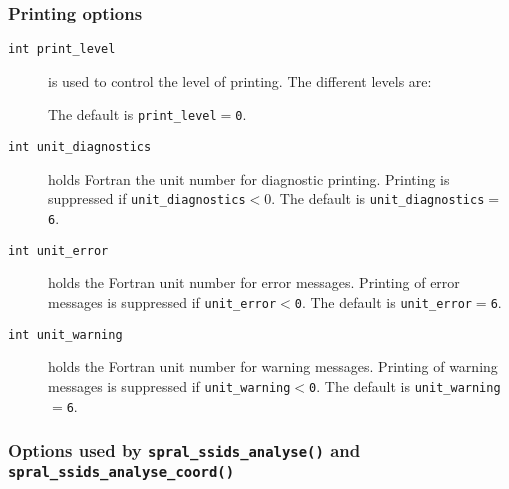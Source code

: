 \subsubsection*{Printing options}

\begin{description}

\item[\texttt{int print\_level}]  is used to control the level of printing.
   The different levels are:
The default is {\tt print\_level$=$\tt 0}.

\item[\texttt{int unit\_diagnostics}]  holds Fortran the
unit number for diagnostic printing. Printing is suppressed if
{\tt unit\_diagnostics$<0$}.
The default is {\tt unit\_diagnostics$=$6}.

\item[\texttt{int unit\_error}] holds the Fortran
unit number for error messages.
Printing of error messages
is suppressed if {\tt unit\_error$<$0}.
The default is {\tt unit\_error$=$6}.

\item[\texttt{int unit\_warning}] holds the Fortran
unit number for warning messages.
Printing of warning messages is suppressed if {\tt unit\_warning$<$0}.
The default is {\tt unit\_warning$=$6}.

\end{description}



\subsubsection*{Options used by {\tt spral\_ssids\_analyse()} and
{\tt spral\_ssids\_analyse\_coord()}}

